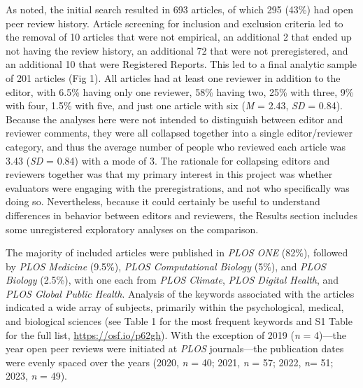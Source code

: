 \documentclass[authordate, meta]{jote-new-article}
\begin{document}
	As noted, the initial search resulted in 693 articles, of which 295 (43\%) had open peer review history. Article screening for inclusion and exclusion criteria led to the removal of 10 articles that were not empirical, an additional 2 that ended up not having the review history, an additional 72 that were not preregistered, and an additional 10 that were Registered Reports. This led to a final analytic sample of 201 articles (Fig 1). All articles had at least one reviewer in addition to the editor, with 6.5\% having only one reviewer, 58\% having two, 25\% with three, 9\% with four, 1.5\% with five, and just one article with six (\emph{M} = 2.43, \emph{SD} = 0.84). Because the analyses here were not intended to distinguish between editor and reviewer comments, they were all collapsed together into a single editor/reviewer category, and thus the average number of people who reviewed each article was 3.43 (\emph{SD} = 0.84) with a mode of 3. The rationale for collapsing editors and reviewers together was that my primary interest in this project was whether evaluators were engaging with the preregistrations, and not who specifically was doing so. Nevertheless, because it could certainly be useful to understand differences in behavior between editors and reviewers, the Results section includes some unregistered exploratory analyses on the comparison.

	

	The majority of included articles were published in \emph{PLOS ONE} (82\%), followed by \emph{PLOS Medicine} (9.5\%), \emph{PLOS Computational Biology} (5\%), and \emph{PLOS Biology} (2.5\%), with one each from \emph{PLOS Climate}, \emph{PLOS Digital Health}, and \emph{PLOS Global Public Health}. Analysis of the keywords associated with the articles indicated a wide array of subjects, primarily within the psychological, medical, and biological sciences (see Table 1 for the most frequent keywords and S1 Table for the full list, \url{https://osf.io/p62gh}). With the exception of 2019 (\emph{n} = 4)—the year open peer reviews were initiated at \emph{PLOS} journals—the publication dates were evenly spaced over the years (2020, \emph{n} = 40; 2021, \emph{n} = 57; 2022, \emph{n}= 51; 2023, \emph{n} = 49).
\end{document}
